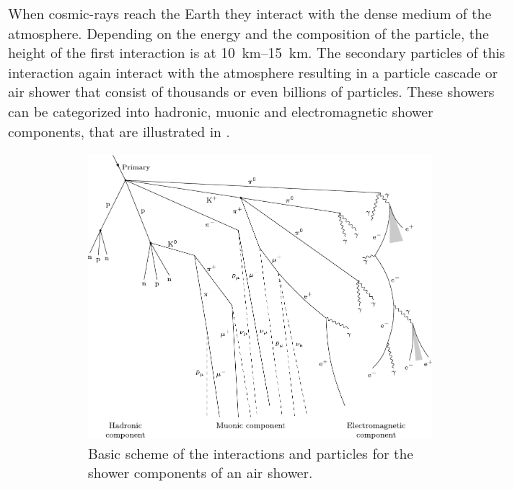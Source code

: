 When cosmic-rays reach the Earth they interact with the dense medium of the atmosphere.
Depending on the energy and the composition of the particle, the height of the first interaction is at \SIrange{10}{15}{km}.
The secondary particles of this interaction again interact with the atmosphere resulting in a particle cascade or air shower that consist of thousands or even billions of particles.
These showers can be categorized into hadronic, muonic and electromagnetic shower components, that are illustrated in .

\begin{figure}
    \centering
    \begin{subfigure}[t]{0.47\textwidth}
        \centering
        \includegraphics[width=\textwidth]{./images/air_shower_components.pdf}
        \caption{Basic scheme of the interactions and particles for the shower components of an air shower. \cite{Barrantes18EAS}}
        \label{fig:air_shower_components}
    \end{subfigure}
    \hfill
    \begin{subfigure}[t]{0.47\textwidth}
        \centering

\end{subfigure}
\end{figure}
